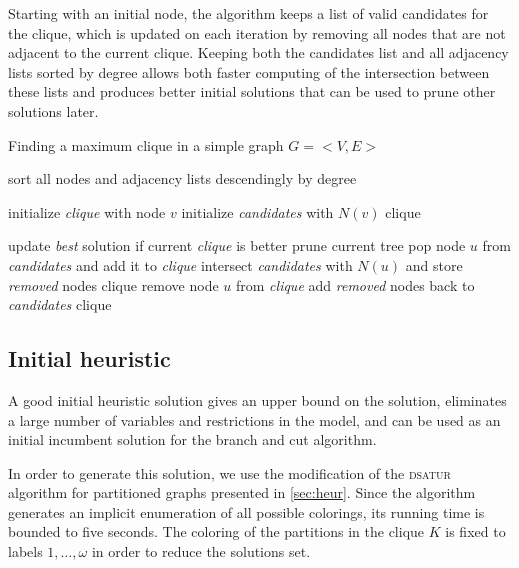 Starting with an initial node, the algorithm keeps a list of valid candidates for the clique, which is updated on each iteration by removing all nodes that are not adjacent to the current clique. Keeping both the candidates list and all adjacency lists sorted by degree allows both faster computing of the intersection between these lists and produces better initial solutions that can be used to prune other solutions later.

\begin{algorithm}
\caption{Finding a maximum clique in a simple graph $G=<V,E>$}
\label{alg:gpclique}

\begin{algorithmic}

\STATE sort all nodes and adjacency lists descendingly by degree

	\STATE initialize \textit{clique} with node $v$
	\STATE initialize \textit{candidates} with $N(v)$
	\CALL clique 
\ENDFOR

		\STATE update \textit{best} solution if current \textit{clique} is better
		\STATE prune current tree
	\ELSE
		\STATE pop node $u$ from \textit{candidates} and add it to \textit{clique}
		\STATE intersect \textit{candidates} with $N(u)$ and store \textit{removed} nodes
		\CALL clique
		\STATE remove node $u$ from \textit{clique}
		\STATE add \textit{removed} nodes back to \textit{candidates} 
		\CALL clique
	\ENDIF
\ENDPROC

\end{algorithmic}
\end{algorithm} 

\subsection{Initial heuristic}

A good initial heuristic solution gives an upper bound on the solution, eliminates a large number of variables and restrictions in the model, and can be used as an initial incumbent solution for the branch and cut algorithm. 

In order to generate this solution, we use the modification of the \textsc{dsatur} algorithm for partitioned graphs presented in \ref{sec:heur}. Since the algorithm generates an implicit enumeration of all possible colorings, its running time is bounded to five seconds. The coloring of the partitions in the clique $K$ is fixed to labels $1, \ldots, \omega$ in order to reduce the solutions set.

